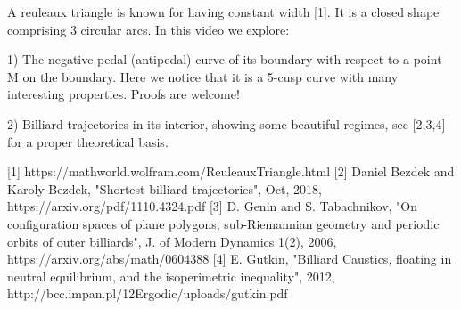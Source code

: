 A reuleaux triangle is known for having constant width [1]. It is a closed shape comprising 3 circular arcs. In this video we explore:

1) The negative pedal (antipedal) curve of its boundary with respect to a point M on the boundary. Here we notice that it is a 5-cusp curve with many interesting properties. Proofs are welcome!

2) Billiard trajectories in its interior, showing some beautiful regimes, see [2,3,4] for a proper theoretical basis.

[1] https://mathworld.wolfram.com/ReuleauxTriangle.html
[2] Daniel Bezdek and Karoly Bezdek, "Shortest billiard trajectories", Oct, 2018, https://arxiv.org/pdf/1110.4324.pdf
[3] D. Genin and S. Tabachnikov, "On configuration spaces of plane polygons, sub-Riemannian geometry and periodic orbits of outer billiards", J. of Modern Dynamics 1(2), 2006, https://arxiv.org/abs/math/0604388
[4] E. Gutkin, "Billiard Caustics, floating in neutral equilibrium, and the isoperimetric inequality", 2012, http://bcc.impan.pl/12Ergodic/uploads/gutkin.pdf